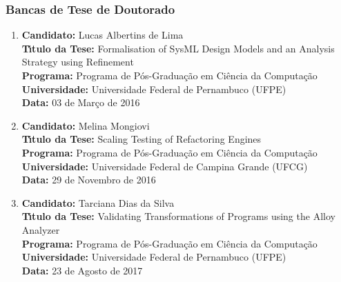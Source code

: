 \documentclass[a4paper,oneside,10pt]{article}
\begin{document}

\subsubsection{Bancas de Tese de Doutorado}

\begin{enumerate}
\renewcommand{\labelenumi}{{\large\bfseries\arabic{enumi}.}}
\vspace{0.3cm}

\item       \textbf{Candidato:} Lucas Albertins de Lima \mbox{} \\
            \textbf{T\'{\i}tulo da Tese:} Formalisation of SysML Design Models and an Analysis Strategy using Refinement\\
            \textbf{Programa:} Programa de Pós-Graduação em Ciência da Computação\\
            \textbf{Universidade:} Universidade Federal de Pernambuco (UFPE)\\
            \textbf{Data:} 03 de Março de 2016

\item       \textbf{Candidato:} Melina Mongiovi \mbox{} \\
            \textbf{T\'{\i}tulo da Tese:} Scaling Testing of Refactoring Engines\\
            \textbf{Programa:} Programa de Pós-Graduação em Ciência da Computação\\
            \textbf{Universidade:} Universidade Federal de Campina Grande (UFCG)\\
            \textbf{Data:} 29 de Novembro de 2016

\item       \textbf{Candidato:} Tarciana Dias da Silva \mbox{} \\
            \textbf{T\'{\i}tulo da Tese:} Validating Transformations of Programs using the Alloy Analyzer\\
            \textbf{Programa:} Programa de Pós-Graduação em Ciência da Computação\\
            \textbf{Universidade:} Universidade Federal de Pernambuco (UFPE)\\
            \textbf{Data:} 23 de Agosto de 2017


\end{enumerate}
\end{document}
